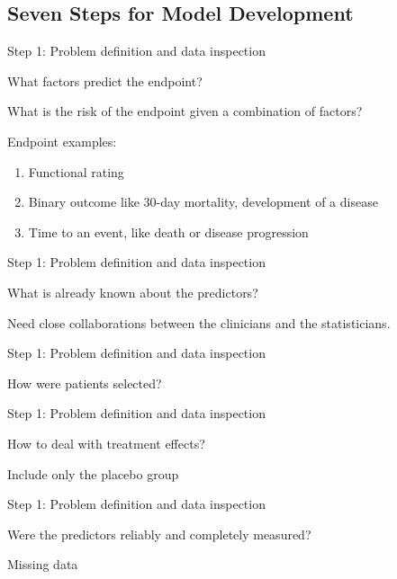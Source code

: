 \documentclass[10pt,ignorenonframetext,]{beamer}
\providecommand{\tightlist}{%
\setlength{\itemsep}{0pt}\setlength{\parskip}{0pt}}
\begin{document}
\subsection{Seven Steps for Model
Development}\label{seven-steps-for-model-development}

\begin{frame}{Step 1: Problem definition and data inspection}

What factors predict the endpoint?

What is the risk of the endpoint given a combination of factors?

Endpoint examples:

\begin{enumerate}[<+->]
\def\labelenumi{\arabic{enumi}.}
\tightlist
\item
  Functional rating
\item
  Binary outcome like 30-day mortality, development of a disease
\item
  Time to an event, like death or disease progression
\end{enumerate}

\end{frame}

\begin{frame}{Step 1: Problem definition and data inspection}

What is already known about the predictors?

Need close collaborations between the clinicians and the statisticians.

\end{frame}

\begin{frame}{Step 1: Problem definition and data inspection}

How were patients selected?

\end{frame}

\begin{frame}{Step 1: Problem definition and data inspection}

How to deal with treatment effects?

Include only the placebo group

\end{frame}

\begin{frame}{Step 1: Problem definition and data inspection}

Were the predictors reliably and completely measured?

Missing data

\end{frame}
\end{document}
